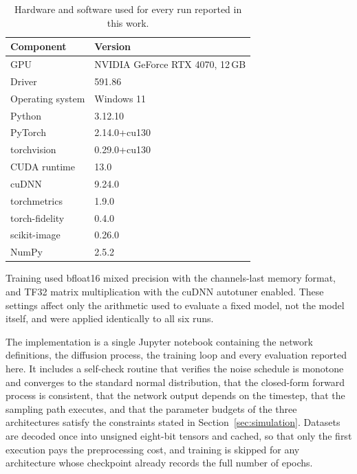 \begin{table}[htbp]
    \centering
    \caption{Hardware and software used for every run reported in this work.}
    \label{tab:environment}
    \small
    \begin{tabular}{ll}
        \toprule
        Component & Version \\
        \midrule
        GPU & NVIDIA GeForce RTX 4070, 12\,GB \\
        Driver & 591.86 \\
        Operating system & Windows 11 \\
        Python & 3.12.10 \\
        PyTorch & 2.14.0+cu130 \\
        torchvision & 0.29.0+cu130 \\
        CUDA runtime & 13.0 \\
        cuDNN & 9.24.0 \\
        torchmetrics & 1.9.0 \\
        torch-fidelity & 0.4.0 \\
        scikit-image & 0.26.0 \\
        NumPy & 2.5.2 \\
        \bottomrule
    \end{tabular}
\end{table}

Training used bfloat16 mixed precision with the channels-last memory format, and TF32 matrix
multiplication with the cuDNN autotuner enabled. These settings affect only the arithmetic used to
evaluate a fixed model, not the model itself, and were applied identically to all six runs.

The implementation is a single Jupyter notebook containing the network definitions, the diffusion
process, the training loop and every evaluation reported here. It includes a self-check routine that
verifies the noise schedule is monotone and converges to the standard normal distribution, that the
closed-form forward process is consistent, that the network output depends on the timestep, that the
sampling path executes, and that the parameter budgets of the three architectures satisfy the
constraints stated in Section~\ref{sec:simulation}. Datasets are decoded once into unsigned
eight-bit tensors and cached, so that only the first execution pays the preprocessing cost, and
training is skipped for any architecture whose checkpoint already records the full number of epochs.

